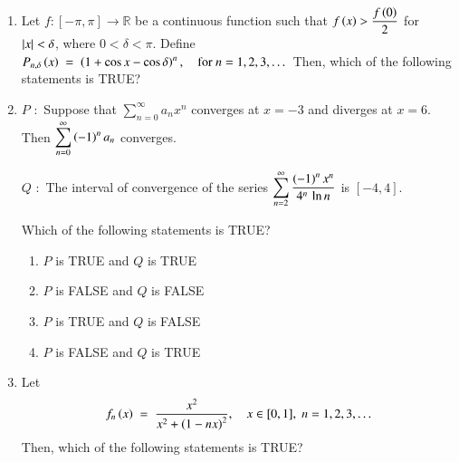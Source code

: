 \documentclass[journal,12pt,onecolumn]{IEEEtran}
\theoremstyle{remark}
\begin{document}
\begin{enumerate}
\item Let $f \colon \left[-\pi,\pi\right] \to \mathbb{R}$ be a continuous function such that $f\left(x\right) > \dfrac{f\left(0\right)}{2}$ for $\left\vert x\right\vert < \delta$, where $0 < \delta < \pi$. Define $P_{n,\delta}\left(x\right) \;=\; \left(1 + \cos x - \cos \delta\right)^{n}, \quad \text{for } n = 1,2,3,\dots$
Then, which of the following statements is TRUE?

\hfill{}

\begin{enumerate}
\end{enumerate}

\item $P$ $\colon$ Suppose that $\displaystyle\sum_{n=0}^{\infty} a_{n}x^{n}$ converges at $x=-3$ and diverges at $x=6$. Then $\displaystyle\sum_{n=0}^{\infty} \left(-1\right)^{n} a_{n}$ converges.

$Q$ $\colon$ The interval of convergence of the series $\displaystyle\sum_{n=2}^{\infty} \frac{\left(-1\right)^{n} x^{n}}{4^{n}\,\ln n}$ is $[-4,4]$.

Which of the following statements is TRUE?

\hfill{}

\begin{enumerate}
\item $P$ is TRUE and $Q$ is TRUE
\item $P$ is FALSE and $Q$ is FALSE
\item $P$ is TRUE and $Q$ is FALSE
\item $P$ is FALSE and $Q$ is TRUE
\end{enumerate}

\item Let
\begin{align*}
f_{n}\left(x\right) \;=\; \frac{x^{2}}{x^{2} + \left(1 - n x\right)^{2}}, \quad x \in [0,1],\; n = 1,2,3,\dots
\end{align*}
Then, which of the following statements is TRUE?


\end{enumerate}
\end{document}
